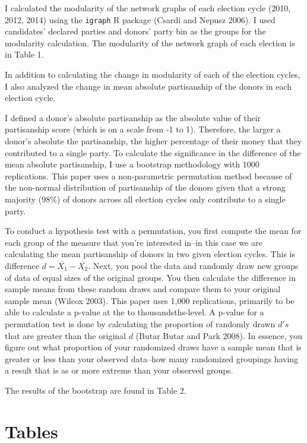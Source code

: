 \documentclass[12pt,]{article}
\begin{document}
I calculated the modularity of the network graphs of each election cycle
(2010, 2012, 2014) using the \texttt{igraph} R package (Csardi and
Nepusz 2006). I used candidates' declared parties and donors' party bin
as the groups for the modularity calculation. The modularity of the
network graph of each election is in Table 1.

In addition to calculating the change in modularity of each of the
election cycles, I also analyzed the change in mean absolute
partisanship of the donors in each election cycle.

I defined a donor's absolute partisanship as the absolute value of their
partisanship score (which is on a scale from -1 to 1). Therefore, the
larger a donor's absolute the partisanship, the higher percentage of
their money that they contributed to a single party. To calculate the
significance in the difference of the mean absolute partisanship, I use
a bootstrap methodology with 1000 replications. This paper uses a
non-parametric permutation method because of the non-normal distribution
of partisanship of the donors given that a strong majority (98\%) of
donors across all election cycles only contribute to a single party.

To conduct a hypothesis test with a permutation, you first compute the
mean for each group of the measure that you're interested in--in this
case we are calculating the mean partisanship of donors in two given
election cycles. This is difference
\(d = \overline{X_{1}}-\overline{X_{2}}\). Next, you pool the data and
randomly draw new groups of data of equal sizes of the original groups.
You then calculate the difference in sample means from these random
draws and compare them to your original sample mean (Wilcox 2003). This
paper uses 1,000 replications, primarily to be able to calculate a
p-value at the to thousandsths-level. A p-value for a permutation test
is done by calculating the proportion of randomly drawn \(d's\) that are
greater than the original \(d\) (Butar Butar and Park 2008). In essence,
you figure out what proportion of your randomized draws have a sample
mean that is greater or less than your observed data--how many
randomized groupings having a result that is as or more extreme than
your observed groups.

The results of the bootstrap are found in Table 2.

\newpage

\hypertarget{tables}{%
\section{Tables}\label{tables}}
\end{document}
